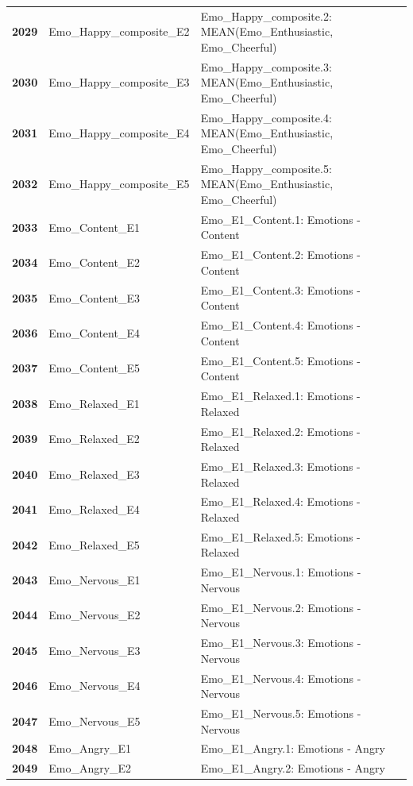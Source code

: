 \documentclass[
  letterpaper,
  DIV=11,
  numbers=noendperiod]{scrartcl}
\begin{document}
\begin{longtable}[t]{>{}cll}
\textbf{2029} & Emo\_Happy\_composite\_E2 & Emo\_Happy\_composite.2: MEAN(Emo\_Enthusiastic, Emo\_Cheerful)\\
\textbf{2030} & Emo\_Happy\_composite\_E3 & Emo\_Happy\_composite.3: MEAN(Emo\_Enthusiastic, Emo\_Cheerful)\\
\addlinespace
\textbf{2031} & Emo\_Happy\_composite\_E4 & Emo\_Happy\_composite.4: MEAN(Emo\_Enthusiastic, Emo\_Cheerful)\\
\textbf{2032} & Emo\_Happy\_composite\_E5 & Emo\_Happy\_composite.5: MEAN(Emo\_Enthusiastic, Emo\_Cheerful)\\
\textbf{2033} & Emo\_Content\_E1 & Emo\_E1\_Content.1: Emotions - Content\\
\textbf{2034} & Emo\_Content\_E2 & Emo\_E1\_Content.2: Emotions - Content\\
\textbf{2035} & Emo\_Content\_E3 & Emo\_E1\_Content.3: Emotions - Content\\
\addlinespace
\textbf{2036} & Emo\_Content\_E4 & Emo\_E1\_Content.4: Emotions - Content\\
\textbf{2037} & Emo\_Content\_E5 & Emo\_E1\_Content.5: Emotions - Content\\
\textbf{2038} & Emo\_Relaxed\_E1 & Emo\_E1\_Relaxed.1: Emotions - Relaxed\\
\textbf{2039} & Emo\_Relaxed\_E2 & Emo\_E1\_Relaxed.2: Emotions - Relaxed\\
\textbf{2040} & Emo\_Relaxed\_E3 & Emo\_E1\_Relaxed.3: Emotions - Relaxed\\
\addlinespace
\textbf{2041} & Emo\_Relaxed\_E4 & Emo\_E1\_Relaxed.4: Emotions - Relaxed\\
\textbf{2042} & Emo\_Relaxed\_E5 & Emo\_E1\_Relaxed.5: Emotions - Relaxed\\
\textbf{2043} & Emo\_Nervous\_E1 & Emo\_E1\_Nervous.1: Emotions - Nervous\\
\textbf{2044} & Emo\_Nervous\_E2 & Emo\_E1\_Nervous.2: Emotions - Nervous\\
\textbf{2045} & Emo\_Nervous\_E3 & Emo\_E1\_Nervous.3: Emotions - Nervous\\
\addlinespace
\textbf{2046} & Emo\_Nervous\_E4 & Emo\_E1\_Nervous.4: Emotions - Nervous\\
\textbf{2047} & Emo\_Nervous\_E5 & Emo\_E1\_Nervous.5: Emotions - Nervous\\
\textbf{2048} & Emo\_Angry\_E1 & Emo\_E1\_Angry.1: Emotions - Angry\\
\textbf{2049} & Emo\_Angry\_E2 & Emo\_E1\_Angry.2: Emotions - Angry\\

\end{longtable}
\end{document}
